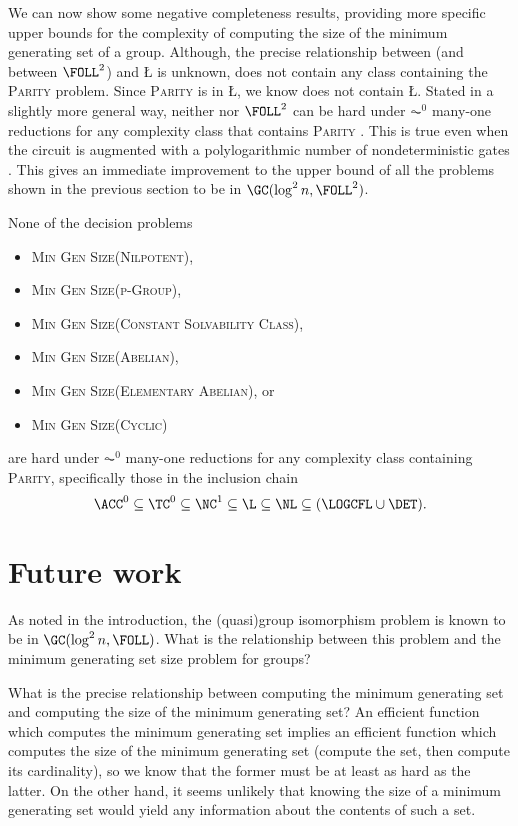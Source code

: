 \documentclass{article}
\begin{document}
We can now show some negative completeness results, providing more specific upper bounds for the complexity of computing the size of the minimum generating set of a group.
Although, the precise relationship between \FOLL{} (and between $\FOLL^2$) and \L{} is unknown, \FOLL{} does not contain any class containing the \textsc{Parity} problem.
Since \textsc{Parity} is in \L, we know \FOLL{} does not contain \L.
Stated in a slightly more general way, neither \FOLL{} nor $\FOLL^2$ can be hard under $\AC^0$ many-one reductions for any complexity class that contains \textsc{Parity} \cite[Proposition~2.1]{bklm01}.
This is true even when the circuit is augmented with a polylogarithmic number of nondeterministic gates \cite[Section~4]{ctw10}.
This gives an immediate improvement to the upper bound of all the problems shown in the previous section to be in $\GC(\log^2 n, \FOLL^2)$.

\begin{theorem}
  None of the decision problems
  \begin{itemize}
  \item \textsc{Min Gen Size(Nilpotent)},
  \item \textsc{Min Gen Size(p-Group)},
  \item \textsc{Min Gen Size(Constant Solvability Class)},
  \item \textsc{Min Gen Size(Abelian)},
  \item \textsc{Min Gen Size(Elementary Abelian)}, or
  \item \textsc{Min Gen Size(Cyclic)}
  \end{itemize}
  are hard under $\AC^0$ many-one reductions for any complexity class containing \textsc{Parity}, specifically those in the inclusion chain
  \begin{equation*}
    \ACC^0 \subseteq \TC^0 \subseteq \NC^1 \subseteq \L \subseteq \NL \subseteq (\LOGCFL \cup \DET).
  \end{equation*}
\end{theorem}

\section{Future work}

As noted in the introduction, the (quasi)group isomorphism problem is known to be in $\GC(\log^2 n, \FOLL)$.
What is the relationship between this problem and the minimum generating set size problem for groups?

What is the precise relationship between computing the minimum generating set and computing the size of the minimum generating set?
An efficient function which computes the minimum generating set implies an efficient function which computes the size of the minimum generating set (compute the set, then compute its cardinality), so we know that the former must be at least as hard as the latter.
On the other hand, it seems unlikely that knowing the size of a minimum generating set would yield any information about the contents of such a set.
\end{document}
